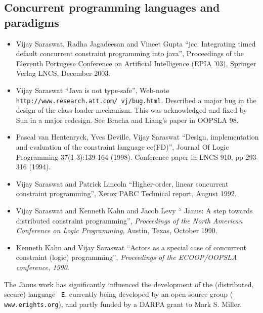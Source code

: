 \documentclass{article}
\begin{document}
\subsection*{Concurrent programming languages and paradigms}
\begin{itemize} 

\item Vijay Saraswat, Radha Jagadeesan and Vineet Gupta ``jcc:
   Integrating timed default concurrent constraint programming into
   java'', Proceedings of the Eleventh Portugese Conference on
   Artificial Intelligence (EPIA '03), Springer Verlag LNCS, December
   2003.

\item Vijay Saraswat ``Java is not type-safe'', Web-note
  \texttt{http://www.research.att.com/~vj/bug.html}. Described a major
  bug in the design of the class-loader mechanism. This was
  acknowledged and fixed by Sun in a major redesign. See Bracha and
  Liang's paper in OOPSLA 98.

\item Pascal van Hentenryck, Yves Deville, Vijay Saraswat ``Design,
    implementation and evaluation of the constraint language cc(FD)'',
    Journal Of Logic Programming 37(1-3):139-164 (1998). Conference
    paper in LNCS 910, pp 293-316 (1994).

\item    Vijay Saraswat and Patrick Lincoln ``Higher-order, linear
    concurrent constraint programming'', Xerox PARC Technical report,
    August 1992.

\item    Vijay Saraswat and Kenneth Kahn and Jacob Levy ``\textsf{
    Janus}: A step towards distributed constraint programming'', \textit{
    Proceedings of the North American Conference on Logic
    Programming}, Austin, Texas, October 1990.

\item    Kenneth Kahn and Vijay Saraswat ``Actors as a special
    case of concurrent constraint (logic) programming'', \textit{
    Proceedings of the ECOOP/OOPSLA conference, 1990}.


\end{itemize}

The \textsf{Janus} work has significantly influenced the development of
the (distributed, secure) language \texttt{ E}, currently being developed
by an open source group (\texttt{ www.erights.org}), and partly funded by
a DARPA grant to Mark S. Miller.
\end{document}
